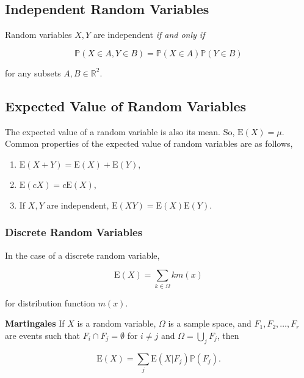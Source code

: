 \documentclass[12pt]{article}
\newcommand{\R}{\mathbb{R}}
\newcommand{\prob}[1]{\mathbb{P}(#1)}
\begin{document}
\begin{center}
\item	\section*{Independent Random Variables}
\end{center}
Random variables $X,Y$ are independent \textit{if and only if} 

\begin{equation*}
\prob{X \in A, Y \in B} = \prob{X \in A} \prob{Y \in B}
\end{equation*}

\noindent
for any subsets $A,B \in \R^2$.
\subsection*{Expected Value of Random Variables}
\noindent
The expected value of a random variable is also its mean. So, $\text{E}(X) = \mu$. Common properties of the expected value of random variables are as follows,

\begin{enumerate}
\item $\text{E}(X + Y) = \text{E}(X) + \text{E}(Y)$,
\item $\text{E}(cX) = c\text{E}(X)$,
\item If $X,Y$ are independent, $\text{E}(XY) = \text{E}(X) \text{E}(Y)$.
\end{enumerate}

\subsubsection*{Discrete Random Variables}
\noindent
In the case of a discrete random variable, 

\begin{equation*}
\text{E}(X) = \sum_{k \in \Omega} k m(x)
\end{equation*}

\noindent
for distribution function $m(x)$.

\vspace*{.5cm}
\noindent
\textbf{Martingales} If $X$ is a random variable, $\Omega$ is a sample space, and $F_1, F_2, \ldots, F_r$ are events such that $F_i \cap F_j = \emptyset$ for $i \neq j$ and $\Omega = \bigcup_j F_j$, then

\begin{equation*}
\text{E}(X) = \sum_j \text{E}(X \lvert F_j) \prob{F_j}.
\end{equation*}
\end{document}

